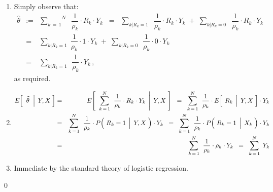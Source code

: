 \begin{enumerate}
\item
	Simply observe that:
	\begin{eqnarray*}
	\widehat{\theta}
	& := &
		\overset{N}{\underset{k\,=\,1}{\sum}}\;\;
		\dfrac{1}{\rho_{k}} \cdot R_{k} \cdot Y_{k}
	\;\; = \;\;
		\underset{k\vert R_{k}=1}{\sum}\;\; \dfrac{1}{\rho_{k}} \cdot R_{k} \cdot Y_{k}
		\; + \;
		\underset{k\vert R_{k}=0}{\sum}\;\; \dfrac{1}{\rho_{k}} \cdot R_{k} \cdot Y_{k}
	\\
	& = &
		\underset{k\vert R_{k}=1}{\sum}\; \dfrac{1}{\rho_{k}} \cdot 1 \cdot Y_{k}
		\; + \;
		\underset{k\vert R_{k}=0}{\sum}\;\, \dfrac{1}{\rho_{k}} \cdot 0 \cdot Y_{k}
	\\
	& = &
		\underset{k\vert R_{k}=1}{\sum}\;\, \dfrac{1}{\rho_{k}} \cdot Y_{k}\,,
	\end{eqnarray*}
	as required.
\item
	\begin{eqnarray*}
	E\!\left[\;\,\left.\widehat{\theta}\;\;\right\vert\;Y,X\;\right]
	& = &
		E\!\left[\;\,
			\left.
			\overset{N}{\underset{k\,=\,1}{\sum}}\;\;
			\dfrac{1}{\rho_{k}} \cdot R_{k} \cdot Y_{k}
			\,\;\right\vert\;
			Y,X
			\;\right]
	\;\; = \;\;
		\overset{N}{\underset{k\,=\,1}{\sum}}\;\;
		\dfrac{1}{\rho_{k}}
		\cdot
		E\!\left[\;
			\left.
			\overset{{\color{white}.}}{R}_{k} 
			\,\;\right\vert\;
			Y,X
			\;\right]
		\cdot Y_{k}
	\\
	& = &
		\overset{N}{\underset{k\,=\,1}{\sum}}\;\;
		\dfrac{1}{\rho_{k}}
		\cdot
		P\!\left(\,
			\left.
			\overset{{\color{white}.}}{R}_{k}=1
			\,\;\right\vert\;
			Y,X
			\;\right)
		\cdot Y_{k}
	\;\; = \;\;
		\overset{N}{\underset{k\,=\,1}{\sum}}\;\;
		\dfrac{1}{\rho_{k}}
		\cdot
		P\!\left(\,
			\left.
			\overset{{\color{white}.}}{R}_{k}=1
			\,\;\right\vert\;
			X_{k}
			\;\right)
		\cdot Y_{k}
	\\
	& = &
		\overset{N}{\underset{k\,=\,1}{\sum}}\;\;
		\dfrac{1}{\rho_{k}} \cdot \rho_{k} \cdot Y_{k}
	\;\; = \;\;
		\overset{N}{\underset{k\,=\,1}{\sum}}\;\, Y_{k}
	\end{eqnarray*}
\item
	Immediate by the standard theory of logistic regression.
\end{enumerate}
\qed



\renewcommand{\theenumi}{\roman{enumi}}
\renewcommand{\labelenumi}{\textnormal{(\theenumi)}$\;\;$}

